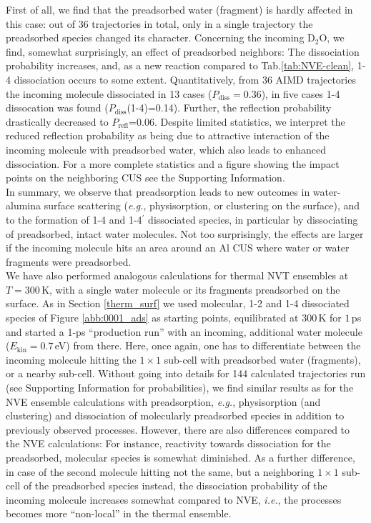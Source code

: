 \documentclass[11pt,DIV=13,BCOR=5mm,a4paper,headinclude]{scrbook}
\begin{document}
First of all, we find that the preadsorbed water (fragment) is hardly affected in this case: out of 36 trajectories in total, only in a single trajectory the preadsorbed species changed its character.
Concerning the incoming D$_2$O, we find, somewhat surprisingly, an effect of preadsorbed neighbors: The dissociation probability increases, and, as a new reaction compared to Tab.\ref{tab:NVE-clean}, 1-4 dissociation occurs to some extent.
Quantitatively, from 36 AIMD trajectories the incoming molecule dissociated in 13 cases ($P_\textrm{diss}=0.36$), in five cases 1-4 dissocation was found ($P_\textrm{diss}$(1-4)=0.14).
Further, the reflection probability drastically decreased to $P_\textrm{refl}$=0.06. Despite limited statistics, we interpret the reduced reflection probability as being due to attractive interaction of the incoming molecule with preadsorbed water, which also leads to enhanced dissociation.
For a more complete statistics and a figure showing the impact points on the neighboring CUS see the Supporting Information.
\\


In summary, we observe that preadsorption leads to new outcomes in water-alumina surface scattering (\textit{e.g.}, physisorption, or clustering on the surface), and to the formation of 1-4 and 1-4$^\prime$ dissociated species, in particular by dissociating of preadsorbed, intact water molecules.
Not too surprisingly, the effects are larger if the incoming molecule hits an area around an Al CUS where water or water fragments were preadsorbed.
\\

We have also performed analogous calculations for thermal NVT ensembles at $T=300\,$K, with a single water molecule or its fragments preadsorbed on the surface.
As in Section \ref{therm_surf} we used molecular, 1-2 and 1-4 dissociated species of Figure \ref{abb:0001_ads} as starting points, equilibrated at $300\,$K for $1\,$ps and started a 1-ps ``production run''  with an incoming, additional water molecule ($E_\textrm{kin}=0.7\,$eV) from there.
Here, once again, one has to differentiate between the incoming molecule hitting the  $1\times 1$ sub-cell with preadsorbed water (fragments), or a nearby sub-cell.
Without going into details for 144 calculated trajectories run (see Supporting Information for probabilities), we find similar results as for the NVE ensemble calculations with preadsorption, \textit{e.g.}, physisorption (and clustering) and dissociation of molecularly preadsorbed species in addition to previously observed processes.
However, there are also differences compared to the NVE calculations: For instance, reactivity towards dissociation for the preadsorbed, molecular species is somewhat diminished. As a further difference, in case of the second molecule hitting not the same, but a neighboring $1\times 1$ sub-cell of the preadsorbed species instead, the dissociation probability of the incoming molecule increases somewhat compared to NVE, \textit{i.e.}, the processes becomes more ``non-local'' in the thermal ensemble.
\end{document}
